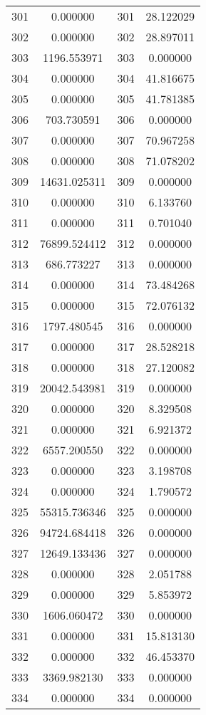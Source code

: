 \documentclass[12pt]{article}
\begin{document}
\begin{longtable}{@{}cccc@{}}
301 & 0.000000 & 301 & 28.122029 \\
302 & 0.000000 & 302 & 28.897011 \\
303 & 1196.553971 & 303 & 0.000000 \\
304 & 0.000000 & 304 & 41.816675 \\
305 & 0.000000 & 305 & 41.781385 \\
306 & 703.730591 & 306 & 0.000000 \\
307 & 0.000000 & 307 & 70.967258 \\
308 & 0.000000 & 308 & 71.078202 \\
309 & 14631.025311 & 309 & 0.000000 \\
310 & 0.000000 & 310 & 6.133760 \\
311 & 0.000000 & 311 & 0.701040 \\
312 & 76899.524412 & 312 & 0.000000 \\
313 & 686.773227 & 313 & 0.000000 \\
314 & 0.000000 & 314 & 73.484268 \\
315 & 0.000000 & 315 & 72.076132 \\
316 & 1797.480545 & 316 & 0.000000 \\
317 & 0.000000 & 317 & 28.528218 \\
318 & 0.000000 & 318 & 27.120082 \\
319 & 20042.543981 & 319 & 0.000000 \\
320 & 0.000000 & 320 & 8.329508 \\
321 & 0.000000 & 321 & 6.921372 \\
322 & 6557.200550 & 322 & 0.000000 \\
323 & 0.000000 & 323 & 3.198708 \\
324 & 0.000000 & 324 & 1.790572 \\
325 & 55315.736346 & 325 & 0.000000 \\
326 & 94724.684418 & 326 & 0.000000 \\
327 & 12649.133436 & 327 & 0.000000 \\
328 & 0.000000 & 328 & 2.051788 \\
329 & 0.000000 & 329 & 5.853972 \\
330 & 1606.060472 & 330 & 0.000000 \\
331 & 0.000000 & 331 & 15.813130 \\
332 & 0.000000 & 332 & 46.453370 \\
333 & 3369.982130 & 333 & 0.000000 \\
334 & 0.000000 & 334 & 0.000000 \\

\end{longtable}
\end{document}
